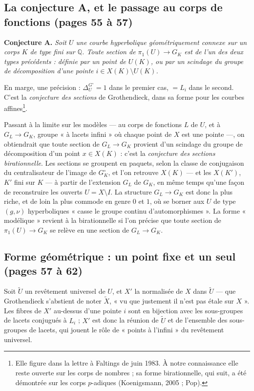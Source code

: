\documentclass[11pt,a4paper]{article}
\begin{document}
\subsection*{La conjecture A, et le passage au corps de fonctions (pages 55 à 57)}

\textbf{Conjecture A.} \emph{Soit $U$ une courbe hyperbolique géométriquement
connexe sur un corps $K$ de type fini sur $\mathbb{Q}$. Toute section de
$\pi_1(U) \to G_K$ est de l'un des deux types précédents : définie par un
point de $U(K)$, ou par un scindage du groupe de décomposition d'une pointe
$i \in X(K) \setminus U(K)$.}

En marge, une précision : $\Delta_U^{G^{\circ}} = 1$ dans le premier cas,
$= L_i$ dans le second. C'est la \emph{conjecture des sections} de
Grothendieck, dans sa forme pour les courbes affines\footnote{Elle figure dans
la lettre à Faltings de juin 1983. À notre connaissance elle reste ouverte
sur les corps de nombres ; sa forme birationnelle, qui suit, a été démontrée
sur les corps $p$-adiques (Koenigsmann, 2005 ; Pop).}.

Passant à la limite sur les modèles — au corps de fonctions $L$ de $U$, et à
$G_L \to G_K$, groupe « à lacets infini » où chaque point de $X$ est une
pointe —, on obtiendrait que toute section de $G_L \to G_K$ provient d'un
scindage du groupe de décomposition d'un point $x \in X(K)$ : c'est la
\emph{conjecture des sections birationnelle}. Les sections se groupent en
paquets, selon la classe de conjugaison du centralisateur de l'image de
$G_K^{\circ}$, et l'on retrouve $X(K)$ — et les $X(K')$, $K'$ fini sur $K$ —
à partir de l'extension $G_L$ de $G_K$, en même temps qu'une façon de
reconstruire les ouverts $U = X \setminus I$. La structure $G_L \to G_K$ est
donc la plus riche, et de loin la plus commode en genre $0$ et $1$, où se
borner aux $U$ de type $(g, \nu)$ hyperboliques « casse le groupe continu
d'automorphismes ». La forme « modélique » revient à la birationnelle si l'on
précise que toute section de $\pi_1(U) \to G_K$ se relève en une section de
$G_L \to G_K$.

\subsection*{Forme géométrique : un point fixe et un seul (pages 57 à 62)}

Soit $\widetilde{U}$ un revêtement universel de $U$, et $X'$ la normalisée de
$X$ dans $\widetilde{U}$ — que Grothendieck s'abstient de noter
$\widetilde{X}$, « vu que justement il n'est pas étale sur $X$ ». Les fibres
de $X'$ au-dessus d'une pointe $i$ sont en bijection avec les sous-groupes de
lacets conjugués à $L_i$ ; $X'$ est donc la réunion de $\widetilde{U}$ et de
l'ensemble des sous-groupes de lacets, qui jouent le rôle de « points à
l'infini » du revêtement universel.
\end{document}
